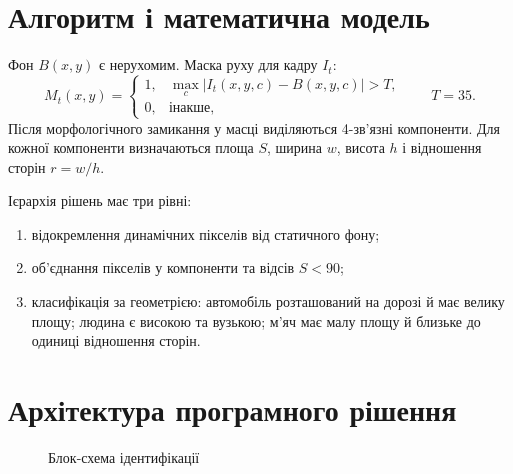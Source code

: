 \documentclass[12pt,a4paper]{article}
\begin{document}
\section{Алгоритм і математична модель}
Фон $B(x,y)$ є нерухомим. Маска руху для кадру $I_t$:
\begin{equation}M_t(x,y)=\begin{cases}1,&\max_c|I_t(x,y,c)-B(x,y,c)|>T,\\0,&\text{інакше},\end{cases}\qquad T=35.\end{equation}
Після морфологічного замикання у масці виділяються 4-зв'язні компоненти. Для кожної компоненти визначаються площа $S$, ширина $w$, висота $h$ і відношення сторін $r=w/h$.

Ієрархія рішень має три рівні:
\begin{enumerate}[leftmargin=*]
\item відокремлення динамічних пікселів від статичного фону;
\item об'єднання пікселів у компоненти та відсів $S<90$;
\item класифікація за геометрією: автомобіль розташований на дорозі й має велику площу; людина є високою та вузькою; м'яч має малу площу й близьке до одиниці відношення сторін.
\end{enumerate}

\section{Архітектура програмного рішення}
\begin{figure}[H]\centering
{}\caption{Блок-схема ідентифікації}
\end{figure}
\end{document}
